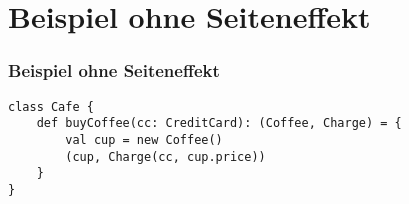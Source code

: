 	\section[Section]{Beispiel ohne Seiteneffekt}
		\begin{frame}[fragile]
		\frametitle{Beispiel ohne Seiteneffekt}
		\begin{lstlisting}[style=myScalastyle]
class Cafe {
	def buyCoffee(cc: CreditCard): (Coffee, Charge) = {
		val cup = new Coffee()
		(cup, Charge(cc, cup.price))
	}
}
\end{lstlisting}
\end{frame}